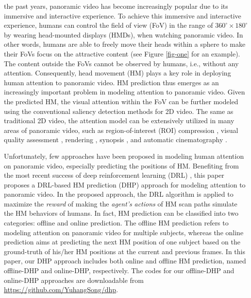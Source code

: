 \documentclass[10pt,journal,compsoc]{IEEEtran}
\begin{document}
%
%
%
%
 the past years, panoramic video \cite{neumann2000immersive} has become increasingly popular due to its immersive and interactive experience.
To achieve this immersive and interactive experience, humans can control the field of view (FoV)  in the range of $360^{\circ} \times 180^{\circ}$ by wearing head-mounted displays (HMDs), when watching panoramic video.
In other words, humans are able to freely move their heads within a sphere to make their FoVs focus on the attractive content (see Figure \ref{fig-one} for an example).
The content outside the FoVs cannot be observed by humans, i.e., without any attention.
Consequently, head movement (HM) plays a key role in deploying human attention to panoramic video.
HM prediction thus emerges as an increasingly important problem in modeling attention to panoramic video.
Given the predicted HM, the visual attention within the FoV can be further modeled using the conventional saliency detection methods \cite{borji2013state} for 2D video.
The same as traditional 2D video, the attention model can be extensively utilized in many areas of panoramic video, such as region-of-interest (ROI) compression \cite{de2016video}, visual quality assessment \cite{gaddam2016tiling, Xu17}, rendering \cite{stengel2016gaze}, synopsis \cite{Pritch08}, and automatic cinematography \cite{su2016pano2vid}.

Unfortunately, few approaches have been proposed in modeling human attention on panoramic video, especially predicting the positions of HM.
Benefiting from the most recent success of deep reinforcement learning (DRL) \cite{mnih2016asynchronous}, this paper proposes a DRL-based HM prediction (DHP) approach for modeling attention to panoramic video.
In the proposed approach, the DRL algorithm is applied to maximize the \textit{reward} of making the \textit{agent's} \textit{actions} of HM scan paths simulate the HM behaviors of humans.
In fact, HM prediction can be classified into two categories: offline and online prediction.
The offline HM prediction refers to modeling attention on panoramic video for multiple subjects, whereas the online prediction aims at predicting the next HM position of one subject based on the ground-truth of his/her HM positions at the current and previous frames. In this paper, our DHP approach includes both online and offline HM prediction, named offline-DHP and online-DHP, respectively.
The codes for our offline-DHP and online-DHP approaches are downloadable from \url{https://github.com/YuhangSong/dhp}.
\end{document}
